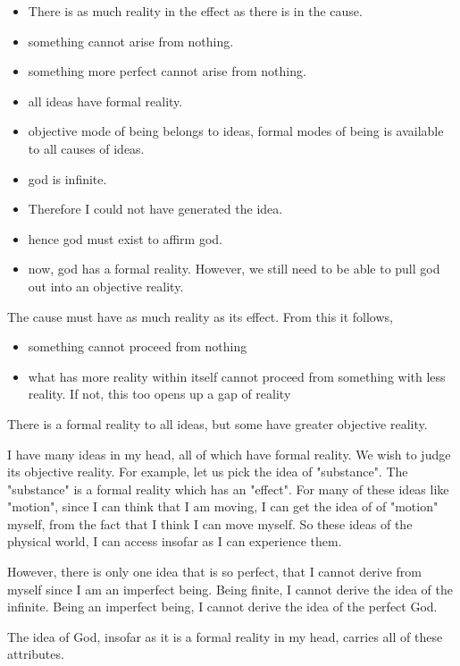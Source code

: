\documentclass[11pt]{book}
\begin{document}
\begin{itemize}
    \item There is as much reality in the effect as there is in the cause.
    \item something cannot arise from nothing.
    \item something more perfect cannot arise from nothing.
    \item all ideas have formal reality.
    \item objective mode of being belongs to ideas, formal modes of being
          is available to all causes of ideas.
    \item god is infinite.
    \item Therefore I could not have generated the idea.
    \item hence god must exist to affirm god.
    \item now, god has a formal reality. However, we still need to be able to
          pull god out into an objective reality.
\end{itemize}

The cause must have as much reality as its effect. From this it follows,

\begin{itemize}
    \item something cannot proceed from nothing
    \item what has more reality within itself cannot proceed from something
        with less reality. If not, this too opens up a gap of reality
\end{itemize}

There is a formal reality to all ideas, but some have greater objective reality.

I have many ideas in my head, all of which have formal reality. We wish to
judge its objective reality. For example, let us pick the idea of "substance".
The "substance" is a formal reality which has an "effect". For many of these
ideas like "motion", since I can think that I am moving, I can get the idea of
of "motion" myself, from the fact that I think I can move myself. So these
ideas of the physical world, I can access insofar as I can experience them.

However, there is only one idea that is so perfect, that I cannot derive from
myself since I am an imperfect being. Being finite, I cannot derive the idea of
the infinite. Being an imperfect being, I cannot derive the idea of the perfect
God.

The idea of God, insofar as it is a formal reality in my head, carries all of
these attributes. 
\end{document}
